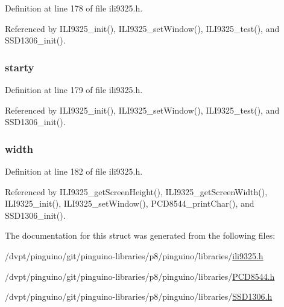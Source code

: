 Definition at line 178 of file ili9325.\-h.



Referenced by I\-L\-I9325\-\_\-init(), I\-L\-I9325\-\_\-set\-Window(), I\-L\-I9325\-\_\-test(), and S\-S\-D1306\-\_\-init().

\hypertarget{structrect__t_af8514b92748148324f80b9df3f2d1366}{
\subsubsection[{starty}]{ starty}}\label{structrect__t_af8514b92748148324f80b9df3f2d1366}


Definition at line 179 of file ili9325.\-h.



Referenced by I\-L\-I9325\-\_\-init(), I\-L\-I9325\-\_\-set\-Window(), I\-L\-I9325\-\_\-test(), and S\-S\-D1306\-\_\-init().

\hypertarget{structrect__t_a5103232dda61eefd81b5b849643c5753}{
\subsubsection[{width}]{ width}}\label{structrect__t_a5103232dda61eefd81b5b849643c5753}


Definition at line 182 of file ili9325.\-h.



Referenced by I\-L\-I9325\-\_\-get\-Screen\-Height(), I\-L\-I9325\-\_\-get\-Screen\-Width(), I\-L\-I9325\-\_\-init(), I\-L\-I9325\-\_\-set\-Window(), P\-C\-D8544\-\_\-print\-Char(), and S\-S\-D1306\-\_\-init().



The documentation for this struct was generated from the following files\-:\begin{DoxyCompactItemize}
\item 
/dvpt/pinguino/git/pinguino-\/libraries/p8/pinguino/libraries/\hyperlink{ili9325_8h}{ili9325.\-h}\item 
/dvpt/pinguino/git/pinguino-\/libraries/p8/pinguino/libraries/\hyperlink{p8_2pinguino_2libraries_2_p_c_d8544_8h}{P\-C\-D8544.\-h}\item 
/dvpt/pinguino/git/pinguino-\/libraries/p8/pinguino/libraries/\hyperlink{p8_2pinguino_2libraries_2_s_s_d1306_8h}{S\-S\-D1306.\-h}\end{DoxyCompactItemize}
